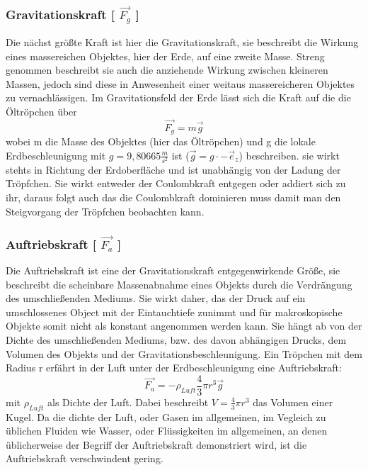 \documentclass{scrartcl}
\begin{document}
			\subsubsection{Gravitationskraft [ $\vec{F_g}$ ]}
			Die nächst größte Kraft ist hier die Gravitationskraft, sie beschreibt die Wirkung eines massereichen Objektes,
			hier der Erde, auf eine zweite Masse. Streng genommen beschreibt sie auch die anziehende Wirkung zwischen kleineren
			Massen, jedoch sind diese in Anwesenheit einer weitaus massereicheren Objektes zu vernachlässigen.
			Im Gravitationsfeld der Erde lässt sich die Kraft auf die die Öltröpchen über
			\begin{equation}
				\vec{F_g} = m\vec{g}
			\end{equation}
			wobei m die Masse des Objektes (hier das Öltröpchen) und g die lokale Erdbeschleunigung mit $g = 9,80665 \frac{m}{s^2}$ ist ($\vec{g} = g \cdot -\vec{e}_z$) beschreiben.
			sie wirkt stehts in Richtung der Erdoberfläche und ist unabhängig von der Ladung der Tröpfchen. Sie wirkt entweder
			der Coulombkraft entgegen oder addiert sich zu ihr, daraus folgt auch das die Coulombkraft dominieren muss damit man den
			Steigvorgang der Tröpfchen beobachten kann.
		
			\subsubsection{Auftriebskraft [ $\vec{F_a}$ ]}
			Die Auftriebskraft ist eine der Gravitationskraft entgegenwirkende Größe, sie beschreibt die scheinbare
			Massenabnahme eines Objekts durch die Verdrängung des umschließenden Mediums. Sie wirkt daher, das der
			Druck auf ein umschlossenes Object mit der Eintauchtiefe zunimmt und für makroskopische Objekte somit
			nicht als konstant angenommen werden kann. Sie hängt ab von der Dichte des umschließenden Mediums, bzw. des davon abhängigen Drucks,
			dem Volumen des Objekts und der Gravitationsbeschleunigung.
			Ein Tröpchen mit dem Radius r erfährt in der Luft unter der Erdbeschleunigung eine Auftriebskraft:
			\begin{equation}
				\vec{F_a} = - \rho_{Luft} \frac{4}{3} \pi r^3 \vec{g}
			\end{equation}
			mit $\rho_{Luft}$ als Dichte der Luft. Dabei beschreibt $V=\frac{4}{3} \pi r^3$ das Volumen einer Kugel.
			Da die dichte der Luft, oder Gasen im allgemeinen, im Vegleich zu üblichen Fluiden wie Wasser, oder Flüssigkeiten im allgemeinen, an denen üblicherweise
			der Begriff der Auftriebskraft demonstriert wird, ist die Auftriebskraft verschwindent gering.
		
\end{document}
